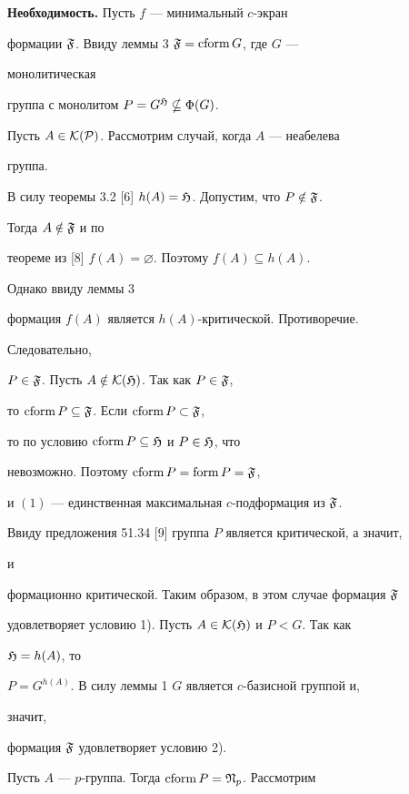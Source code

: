 \begin{pf} 


{\bf Необходимость.} Пусть $f$ --- минимальный $c$-экран 


формации $\frak F$. Ввиду леммы 3 $\frak F=\operatorname{cform} G$, где $G$ --- 


монолитическая 


группа с монолитом $P=G^{\frak H}\nsubseteq\Phi(G)$. 


 


Пусть $A\in\cal K(P)$. Рассмотрим случай, когда $A$ --- неабелева 


группа. 


В силу теоремы 3.2 [6] $h(A)=\frak H$. Допустим, что $P\notin\frak F$. 


Тогда $A\notin\frak F$ и по 


теореме из [8] $f(A)=\varnothing$. Поэтому $f(A)\subseteq h(A)$. 


Однако ввиду леммы 3 


формация $f(A)$ является $h(A)$-критической. Противоречие. 


Следовательно, 


$P\in\frak F$. Пусть $A\notin\cal K(\frak H)$. Так как $P\in\frak F$, 


то $\operatorname{cform} P\subseteq\frak F$. Если $\operatorname{cform} P\subset\frak F$, 


то по условию $\operatorname{cform} P\subseteq\frak H$ и $P\in\frak H$, что 


невозможно. Поэтому $\operatorname{cform} P=\operatorname{form} P=\frak F$, 


и $(1)$ --- единственная максимальная $c$-подформация из $\frak F$. 


Ввиду предложения 51.34 [9] группа $P$ является критической, а значит, 


и 


формационно критической. Таким образом, в этом случае формация $\frak 


F$ 


удовлетворяет условию 1). Пусть $A\in\cal K(\frak H)$ и $P<G$. Так как 


$\frak H=h(A)$, то 


$P=G^{h(A)}$. В силу леммы 1 $G$ является $c$-базисной группой и, 


значит, 


формация $\frak F$ удовлетворяет условию 2). 


 


Пусть $A$ --- $p$-группа. Тогда $\operatorname{cform} P=\frak N_p$. Рассмотрим 



\end{pf}

